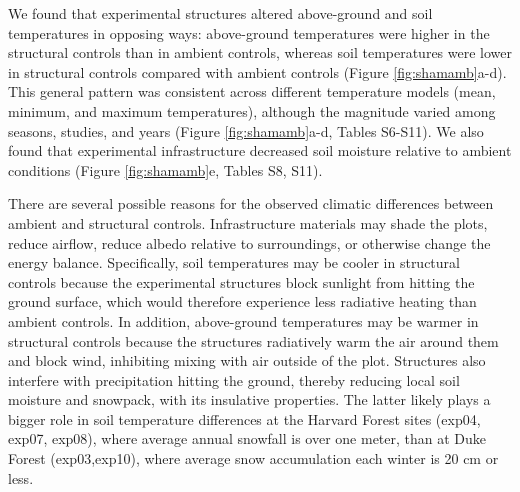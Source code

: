 \documentclass{article}
\begin{document}
\par We found that experimental structures altered above-ground and soil temperatures in opposing ways: above-ground temperatures were higher in the structural controls than in ambient controls, whereas soil temperatures were lower in structural controls compared with ambient controls (Figure \ref{fig:shamamb}a-d). This general pattern was consistent across different temperature models (mean, minimum, and maximum temperatures), although the magnitude varied among seasons, studies, and years (Figure \ref{fig:shamamb}a-d, Tables S6-S11). We also found that experimental infrastructure decreased soil moisture relative to ambient conditions (Figure \ref{fig:shamamb}e, Tables S8, S11). %

\par There are several possible reasons for the observed climatic differences between ambient and structural controls. Infrastructure materials may shade the plots, reduce airflow, reduce albedo relative to surroundings, or otherwise change the energy balance. Specifically, soil temperatures may be cooler in structural controls because the experimental structures block sunlight from hitting the ground surface, which would therefore experience less radiative heating than ambient controls. In addition, above-ground temperatures may be warmer in structural controls because the structures radiatively warm the air around them and block wind, inhibiting mixing with air outside of the plot. Structures also interfere with precipitation hitting the ground, thereby reducing local soil moisture and snowpack, with its insulative properties. %
The latter likely plays a bigger role in soil temperature differences at the Harvard Forest sites (exp04, exp07, exp08), where average annual snowfall is over one meter, than at Duke Forest (exp03,exp10), where average snow accumulation each winter is 20 cm or less. 
\end{document}
